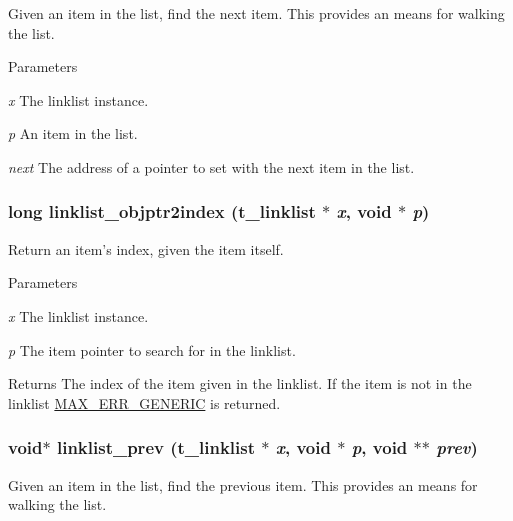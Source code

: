 Given an item in the list, find the next item. This provides an means for walking the list.


\begin{DoxyParams}{Parameters}
\item[{\em x}]The linklist instance. \item[{\em p}]An item in the list. \item[{\em next}]The address of a pointer to set with the next item in the list. \end{DoxyParams}
\hypertarget{group__linklist_ga6ec787cba5eb1c47c294692d4c62e609}{
\subsubsection[{linklist\_\-objptr2index}]{\setlength{\rightskip}{0pt plus 5cm}long linklist\_\-objptr2index ({\bf t\_\-linklist} $\ast$ {\em x}, \/  void $\ast$ {\em p})}}
\label{group__linklist_ga6ec787cba5eb1c47c294692d4c62e609}


Return an item's index, given the item itself. 
\begin{DoxyParams}{Parameters}
\item[{\em x}]The linklist instance. \item[{\em p}]The item pointer to search for in the linklist. \end{DoxyParams}
\begin{DoxyReturn}{Returns}
The index of the item given in the linklist. If the item is not in the linklist \hyperlink{group__misc_gga0764dd6c02b76cca7d053ae50555d69dae285bdd436f17560cfd09c6b31ea397d}{MAX\_\-ERR\_\-GENERIC} is returned. 
\end{DoxyReturn}
\hypertarget{group__linklist_ga62b4f5fce83130358e652601e1286926}{
\subsubsection[{linklist\_\-prev}]{\setlength{\rightskip}{0pt plus 5cm}void$\ast$ linklist\_\-prev ({\bf t\_\-linklist} $\ast$ {\em x}, \/  void $\ast$ {\em p}, \/  void $\ast$$\ast$ {\em prev})}}
\label{group__linklist_ga62b4f5fce83130358e652601e1286926}


Given an item in the list, find the previous item. This provides an means for walking the list.


